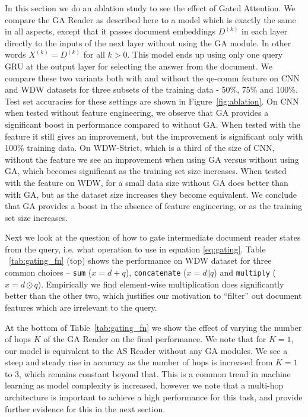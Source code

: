 \documentclass[11pt,a4paper]{article}
\begin{document}
In this section we do an ablation study to see the effect of Gated Attention. We compare the GA Reader as described here to a model which is exactly the same in all aspects, except that it passes document embeddings $D^{(k)}$ in each layer directly to the inputs of the next layer without using the GA module. In other words $X^{(k)}=D^{(k)}$ for all $k>0$. This model ends up using only one query GRU at the output layer for selecting the answer from the document. We compare these two variants both with and without the qe-comm feature on CNN and WDW datasets for three subsets of the training data - 50\%, 75\% and 100\%. Test set accuracies for these settings are shown in Figure~\ref{fig:ablation}. On CNN when tested without feature engineering, we observe that GA provides a significant boost in performance compared to without GA. When tested with the feature it still gives an improvement, but the improvement is significant only with 100\% training data. On WDW-Strict, which is a third of the size of CNN, without the feature we see an improvement when using GA versus without using GA, which becomes significant as the training set size increases. When tested with the feature on WDW, for a small data size without GA does better than with GA, but as the dataset size increases they become equivalent. We conclude that GA provides a boost in the absence of feature engineering, or as the training set size increases.

Next we look at the question of how to gate intermediate document reader states from the query, i.e. what operation to use in equation \ref{eq:gating}. Table ~\ref{tab:gating_fn} (top) shows the performance on WDW dataset for three common choices -- \texttt{sum} ($x=d+q$), \texttt{concatenate} ($x=d \Vert q$) and \texttt{multiply} ($x=d \odot q$). Empirically we find element-wise multiplication does significantly better than the other two, which justifies our motivation to ``filter'' out document features which are irrelevant to the query.

At the bottom of Table~\ref{tab:gating_fn} we show the effect of varying the number of hops $K$ of the GA Reader on the final performance. We note that for $K=1$, our model is equivalent to the AS Reader without any GA modules. We see a steep and steady rise in accuracy as the number of hops is increased from $K=1$ to $3$, which remains constant beyond that. This is a common trend in machine learning as model complexity is increased, however we note that a multi-hop architecture is important to achieve a high performance for this task, and provide further evidence for this in the next section.
\end{document}
